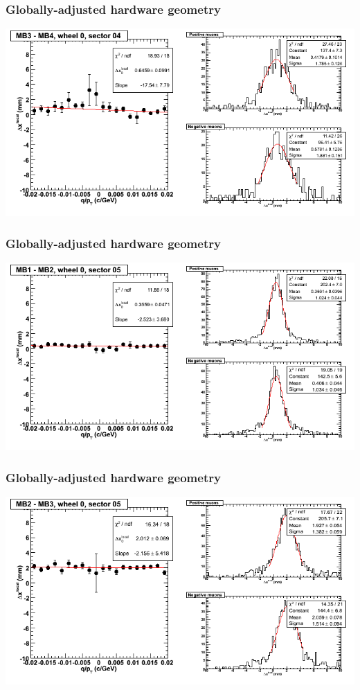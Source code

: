 \documentclass[compress]{beamer}
\begin{document}
\begin{frame}
\frametitle{Globally-adjusted hardware geometry}
\includegraphics[width=\linewidth]{NOV4_segdiffs_HW/dt13_resid_C_04_34.png}
\end{frame}

\begin{frame}
\frametitle{Globally-adjusted hardware geometry}
\includegraphics[width=\linewidth]{NOV4_segdiffs_HW/dt13_resid_C_05_12.png}
\end{frame}

\begin{frame}
\frametitle{Globally-adjusted hardware geometry}
\includegraphics[width=\linewidth]{NOV4_segdiffs_HW/dt13_resid_C_05_23.png}
\end{frame}
\end{document}
